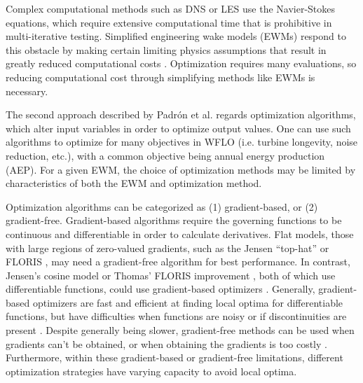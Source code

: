 Complex computational methods such as DNS or LES use the Navier-Stokes equations, which require extensive computational time that is prohibitive in multi-iterative testing.
Simplified engineering wake models (EWMs) respond to this obstacle by making certain limiting physics assumptions that result in greatly reduced computational costs \cite{HerbertAcero2014}.
Optimization requires many evaluations, so reducing computational cost through simplifying methods like EWMs is necessary.

The second approach described by Padr\'on et al. regards optimization algorithms, which alter input variables in order to optimize output values.
One can use such algorithms to optimize for many objectives in WFLO (i.e. turbine longevity, noise reduction, etc.), with a common objective being annual energy production (AEP).
For a given EWM, the choice of optimization methods may be limited by characteristics of both the EWM and optimization method.

Optimization algorithms can be categorized as (1) gradient-based, or (2) gradient-free.
Gradient-based algorithms require the governing functions to be continuous and differentiable in order to calculate derivatives.
Flat models, those with large regions of zero-valued gradients, such as the Jensen ``top-hat'' \cite{Jensen1983} or FLORIS \cite{Gebraad2014}, may need a gradient-free algorithm for best performance.
In contrast, Jensen's cosine model or Thomas' FLORIS improvement \cite{thomas2017}, both of which use differentiable functions, could use gradient-based optimizers \cite{Nocedal2006}.
Generally, gradient-based optimizers are fast and efficient at finding local optima for differentiable functions, but have difficulties when functions are noisy or if discontinuities are present \cite{Nocedal2006}.
Despite generally being slower, gradient-free methods can be used when gradients can't be obtained, or when obtaining the gradients is too costly \cite{Kramer2011}.
Furthermore, within these gradient-based or gradient-free limitations, different optimization strategies have varying capacity to avoid local optima.

